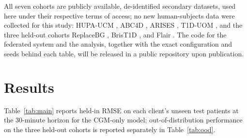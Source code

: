 \documentclass[10pt,letterpaper]{article}
\begin{document}
All seven cohorts are publicly available, de-identified secondary datasets, used
here under their respective terms of access; no new human-subjects data were
collected for this study: HUPA-UCM \cite{hidalgo2024hupaucm}, ABC4D
\cite{abc4d_nct}, ARISES \cite{zhu2022arises}, T1D-UOM \cite{alsuhaymi2025t1duom},
and the three held-out cohorts ReplaceBG \cite{aleppo2017replacebg}, BrisT1D
\cite{james2025brist1d}, and Flair \cite{jaeb_flair}. The code for the federated
system and the analysis, together with the exact configuration and seeds behind
each table, will be released in a public repository upon publication.

\section*{Results}

Table~\ref{tab:main} reports held-in RMSE on each client's unseen test patients at
the 30-minute horizon for the CGM-only model; out-of-distribution performance on
the three held-out cohorts is reported separately in Table~\ref{tab:ood}.
\end{document}
